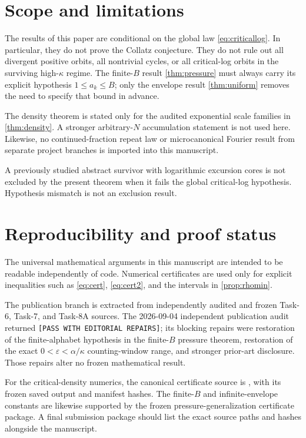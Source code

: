 \documentclass[11pt]{amsart}
\begin{document}
\section{Scope and limitations}

The results of this paper are conditional on the global law \eqref{eq:criticallog}.  In particular, they do not prove the Collatz conjecture.  They do not rule out all divergent positive orbits, all nontrivial cycles, or all critical-log orbits in the surviving high-\(\kappa\) regime.  The finite-\(B\) result \cref{thm:pressure} must always carry its explicit hypothesis \(1\le a_k\le B\); only the envelope result \cref{thm:uniform} removes the need to specify that bound in advance.

The density theorem is stated only for the audited exponential scale families in \cref{thm:density}.  A stronger arbitrary-\(N\) accumulation statement is not used here.  Likewise, no continued-fraction repeat law or microcanonical Fourier result from separate project branches is imported into this manuscript.

A previously studied abstract survivor with logarithmic excursion cores is not excluded by the present theorem when it fails the global critical-log hypothesis.  Hypothesis mismatch is not an exclusion result.

\section{Reproducibility and proof status}

The universal mathematical arguments in this manuscript are intended to be readable independently of code.  Numerical certificates are used only for explicit inequalities such as \eqref{eq:cert}, \eqref{eq:cert2}, and the intervals in \cref{prop:rhomin}.

The publication branch is extracted from independently audited and frozen Task-6, Task-7, and Task-8A sources.  The 2026-09-04 independent publication audit returned \texttt{[PASS WITH EDITORIAL REPAIRS]}; its blocking repairs were restoration of the finite-alphabet hypothesis in the finite-\(B\) pressure theorem, restoration of the exact \(0<\varepsilon<\alpha/\kappa\) counting-window range, and stronger prior-art disclosure.  Those repairs alter no frozen mathematical result.

For the critical-density numerics, the canonical certificate source is
, with its frozen saved output and manifest hashes.  The finite-\(B\) and infinite-envelope constants are likewise supported by the frozen pressure-generalization certificate package.  A final submission package should list the exact source paths and hashes alongside the manuscript.
\end{document}
